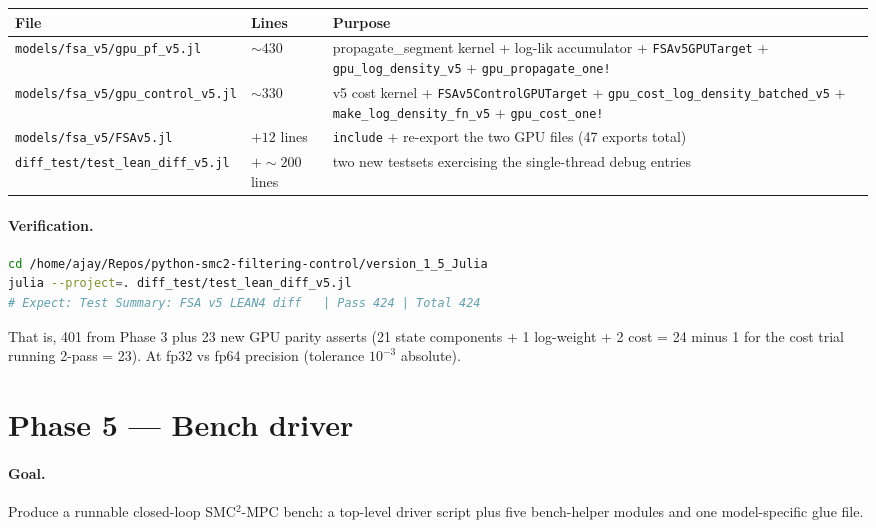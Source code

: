 \documentclass[11pt,a4paper]{article}
\begin{document}
\begin{center}\footnotesize
\begin{tabular}{lll}
\toprule
File & Lines & Purpose \\
\midrule
\texttt{models/fsa\_v5/gpu\_pf\_v5.jl}      & $\sim 430$ & propagate\_segment kernel + log-lik accumulator + \texttt{FSAv5GPUTarget} + \texttt{gpu\_log\_density\_v5} + \texttt{gpu\_propagate\_one!} \\
\texttt{models/fsa\_v5/gpu\_control\_v5.jl}  & $\sim 330$ & v5 cost kernel + \texttt{FSAv5ControlGPUTarget} + \texttt{gpu\_cost\_log\_density\_batched\_v5} + \texttt{make\_log\_density\_fn\_v5} + \texttt{gpu\_cost\_one!} \\
\texttt{models/fsa\_v5/FSAv5.jl}            & $+12$ lines & \texttt{include} + re-export the two GPU files (47 exports total) \\
\texttt{diff\_test/test\_lean\_diff\_v5.jl} & $+\sim 200$ lines & two new testsets exercising the single-thread debug entries \\
\bottomrule
\end{tabular}
\end{center}

\paragraph{Verification.}

\begin{lstlisting}[language=bash]
cd /home/ajay/Repos/python-smc2-filtering-control/version_1_5_Julia
julia --project=. diff_test/test_lean_diff_v5.jl
# Expect: Test Summary: FSA v5 LEAN4 diff   | Pass 424 | Total 424
\end{lstlisting}

That is, 401 from Phase 3 plus 23 new GPU parity asserts (21 state
components + 1 log-weight + 2 cost = 24 minus 1 for the cost
trial running 2-pass = 23). At fp32 vs fp64 precision (tolerance
$10^{-3}$ absolute).


\section{Phase 5 --- Bench driver}
\label{sec:phase5}

\paragraph{Goal.} Produce a runnable closed-loop SMC$^2$-MPC bench:
a top-level driver script plus five bench-helper modules and one
model-specific glue file.
\end{document}
